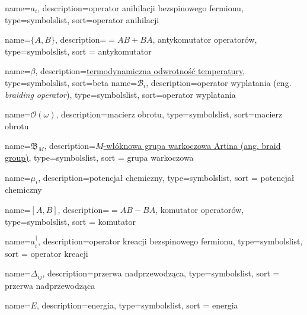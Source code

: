 {
    name=\ensuremath{a_i},
    description={operator anihilacji bezspinowego fermionu},
    type=symbolslist,
    sort=operator anihilacji
}

{
    name=\ensuremath{\{A,B\}},
    description={$=AB+BA$, antykomutator operatorów},
    type=symbolslist,
    sort = antykomutator
}

{
    name=\ensuremath{\beta},
    description={\href{https://en.wikipedia.org/wiki/Thermodynamic_beta}{termodynamiczna odwrotność temperatury}},
    type=symbolslist,
    sort=beta
} 
{
    name=\ensuremath{\mathcal B_i},
    description={operator wyplatania (eng. \textit{braiding operator})},
    type=symbolslist,
    sort=operator wyplatania
} 

{
    name=\ensuremath{\mathcal O(\omega)},
    description={macierz obrotu},
    type=symbolslist,
    sort=macierz obrotu
} 

{
    name=\ensuremath{\mathfrak B_M},
    description={\href{https://en.wikipedia.org/wiki/Braid_group}{$M$-włóknowa grupa warkoczowa Artina (ang. braid group)}},
    type=symbolslist,
    sort = grupa warkoczowa
} 

{
    name=\ensuremath{\mu_i},
    description={potencjał chemiczny},
    type=symbolslist,
    sort = potencjał chemiczny
}

{
    name=\ensuremath{[A,B]},
    description={$=AB-BA$, komutator operatorów},
    type=symbolslist,
    sort = komutator
}


{
    name=\ensuremath{a_i^\dagger},
    description={operator kreacji bezspinowego fermionu},
    type=symbolslist,
    sort = operator kreacji
}

{
    name=\ensuremath{\Delta_{ij}},
    description={przerwa nadprzewodząca},
    type=symbolslist,
    sort = przerwa nadprzewodząca
}


{
    name=\ensuremath{E},
    description={energia},
    type=symbolslist,
    sort = energia
}

